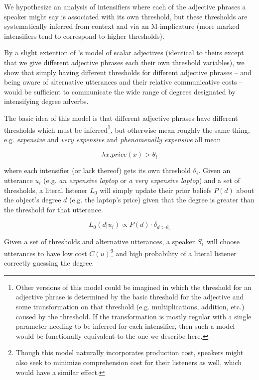 \documentclass[10pt,letterpaper]{article}
\newcommand{\w}[1]{\emph{#1}}
\begin{document}
We hypothesize an analysis of intensifiers where each of the adjective phrases a speaker might say is associated with its own threshold, but these thresholds are systematically inferred from context and via an M-implicature (more marked intensifiers tend to correspond to higher thresholds).

By a slight extention of 's model of scalar adjectives (identical to theirs except that we give different adjective phrases each their own threshold variables), we show that simply having different thresholds for different adjective phrases -- and being aware of alternative utterances and their relative communicative costs -- would be sufficient to communicate the wide range of degrees designated by intensifying degree adverbs.

The basic idea of this model is that different adjective phrases have different thresholds which must be inferred\footnote{Other versions of this model could be imagined in which the threshold for an adjective phrase is determined by the basic threshold for the adjective and some transformation on that threshold (e.g. multiplications, addition, etc.) caused by the threshold. If the transformation is mostly regular with a single parameter needing to be inferred for each intensifier, then such a model would be functionally equivalent to the one we describe here.}, but otherwise mean roughly the same thing, e.g. \w{expensive} and \w{very expensive} and \w{phenomenally expensive} all mean

\[ \lambda x . price(x) > \theta_i \]

where each intensifier (or lack thereof) gets its own threshold $\theta_i$.
Given an utterance $u_i$ (e.g. \w{an expensive laptop} or \w{a very expensive laptop}) and a set of thresholds, a literal listener $L_0$ will simply update their prior beliefs $P(d)$ about the object's degree $d$ (e.g. the laptop's price) given that the degree is greater than the threshold for that utterance.

\[ L_0(d | u_i) \propto P(d) \cdot \delta_{d > \theta_i} \]

Given a set of thresholds and alternative utterances, a speaker $S_1$ will choose utterances to have low cost $C(u)$\footnote{Though this model naturally incorporates production cost, speakers might also seek to minimize comprehension cost for their listeners as well, which would have a similar effect.}
and high probability of a literal listener correctly guessing the degree.
\end{document}
